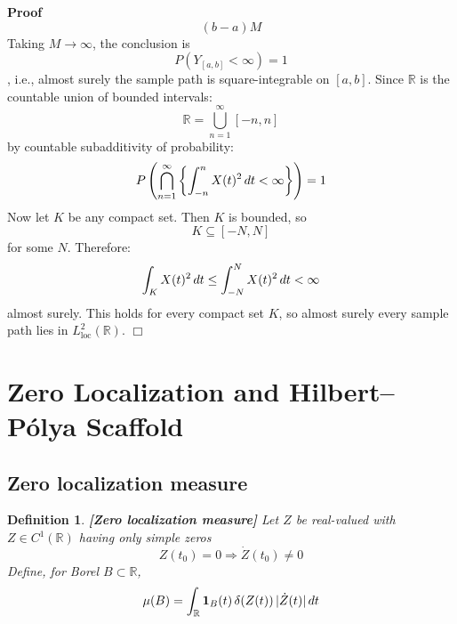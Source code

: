 \documentclass{article}
\newcommand{\tmop}[1]{\ensuremath{\operatorname{#1}}}
\newcommand{\tmstrong}[1]{\textbf{#1}}
\newcommand{\tmtextbf}[1]{\text{{\bfseries{#1}}}}
\newenvironment{proof}{\noindent\textbf{Proof\ }}{\hspace*{\fill}$\Box$\medskip}
\newtheorem{definition}{Definition}
\begin{document}
\begin{proof}
\begin{equation}
{    (b - a)}{M}
  \end{equation}
  Taking $M \to \infty$, the conclusion is
  \begin{equation}
    P (Y_{[a, b]} < \infty) = 1
  \end{equation}
  , i.e., almost surely the sample path is square-integrable on $[a, b]$.
  Since $\mathbb{R}$ is the countable union of bounded intervals:
  \begin{equation}
    \mathbb{R}= \bigcup_{n = 1}^{\infty} [- n, n]
  \end{equation}
  by countable subadditivity of probability:
  \begin{equation}
    P \left( \bigcap_{n = 1}^{\infty} \left\{ \int_{- n}^n X (t)^2 
    \hspace{0.17em} dt < \infty \right\} \right) = 1
  \end{equation}
  Now let $K$ be any compact set. Then $K$ is bounded, so
  \begin{equation}
    K \subseteq [- N, N]
  \end{equation}
  for some $N$. Therefore:
  \begin{equation}
    \int_K X (t)^2  \hspace{0.17em} dt \leq \int_{- N}^N X (t)^2 
    \hspace{0.17em} dt < \infty
  \end{equation}
  almost surely. This holds for every compact set $K$, so almost surely every
  sample path lies in $L^2_{\tmop{loc}} (\mathbb{R})$.
\end{proof}

\section{Zero Localization and Hilbert--P{\'o}lya Scaffold}\label{sec:HP}

\subsection{Zero localization measure}

\begin{definition}
  {\tmstrong{[Zero localization measure]\label{def:zeromeasure}}} Let $Z$ be
  real-valued with $Z \in C^1 (\mathbb{R})$ having only simple zeros
  \begin{equation}
    Z (t_0) = 0 \Rightarrow \dot{Z} (t_0) \neq 0
  \end{equation}
  Define, for Borel $B \subset \mathbb{R}$,
  \begin{equation}
    \mu (B) = \int_{\mathbb{R}} \text{\tmtextbf{1}}_B (t)  \hspace{0.17em}
    \delta (Z (t)) \hspace{0.17em} | \dot{Z} (t) |  \hspace{0.17em} dt
  \end{equation}
\end{definition}
\end{document}
